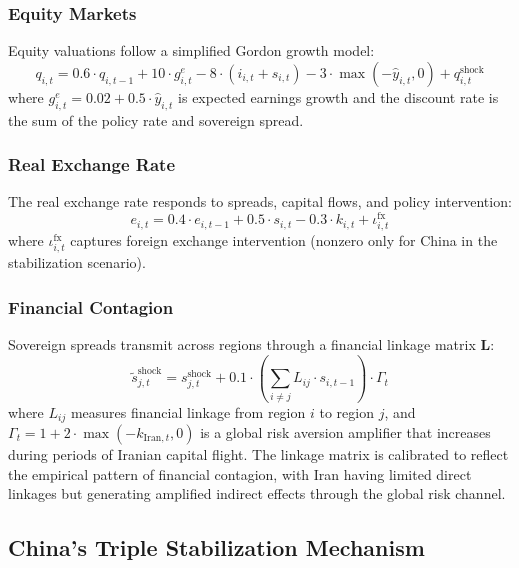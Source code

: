 \documentclass[12pt]{article}
\begin{document}
\subsubsection{Equity Markets}

Equity valuations follow a simplified Gordon growth model:
\begin{equation}
q_{i,t} = 0.6 \cdot q_{i,t-1} + 10 \cdot g^e_{i,t} - 8 \cdot (i_{i,t} + s_{i,t}) - 3 \cdot \max(-\hat{y}_{i,t}, 0) + q^{\text{shock}}_{i,t}
\label{eq:equity}
\end{equation}
where $g^e_{i,t} = 0.02 + 0.5 \cdot \hat{y}_{i,t}$ is expected earnings growth and the discount rate is the sum of the policy rate and sovereign spread.

\subsubsection{Real Exchange Rate}

The real exchange rate responds to spreads, capital flows, and policy intervention:
\begin{equation}
e_{i,t} = 0.4 \cdot e_{i,t-1} + 0.5 \cdot s_{i,t} - 0.3 \cdot k_{i,t} + \iota^{\text{fx}}_{i,t}
\label{eq:rer}
\end{equation}
where $\iota^{\text{fx}}_{i,t}$ captures foreign exchange intervention (nonzero only for China in the stabilization scenario).

\subsubsection{Financial Contagion}

Sovereign spreads transmit across regions through a financial linkage matrix $\mathbf{L}$:
\begin{equation}
\tilde{s}^{\text{shock}}_{j,t} = s^{\text{shock}}_{j,t} + 0.1 \cdot \left(\sum_{i \neq j} L_{ij} \cdot s_{i,t-1}\right) \cdot \Gamma_t
\label{eq:contagion}
\end{equation}
where $L_{ij}$ measures financial linkage from region $i$ to region $j$, and $\Gamma_t = 1 + 2 \cdot \max(-k_{\text{Iran},t}, 0)$ is a global risk aversion amplifier that increases during periods of Iranian capital flight. The linkage matrix is calibrated to reflect the empirical pattern of financial contagion, with Iran having limited direct linkages but generating amplified indirect effects through the global risk channel.


\subsection{China's Triple Stabilization Mechanism}
\end{document}
